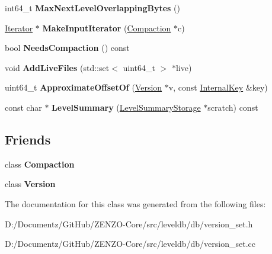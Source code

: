 \begin{DoxyCompactItemize}
\mbox{\label{classleveldb_1_1_version_set_a32dc1a7e1eaeeeac89286be3483ad612}} 
int64\+\_\+t {\bfseries Max\+Next\+Level\+Overlapping\+Bytes} ()
\item 
\mbox{\label{classleveldb_1_1_version_set_a181194e96a88e69a60c1fda9cf3c4651}} 
\mbox{\hyperlink{classleveldb_1_1_iterator}{Iterator}} $\ast$ {\bfseries Make\+Input\+Iterator} (\mbox{\hyperlink{classleveldb_1_1_compaction}{Compaction}} $\ast$c)
\item 
\mbox{\label{classleveldb_1_1_version_set_a5a8a8a80e14a141672c7fdc9c7dd7328}} 
bool {\bfseries Needs\+Compaction} () const
\item 
\mbox{\label{classleveldb_1_1_version_set_a3b3c810f0fea88db81b94e604b3dd78f}} 
void {\bfseries Add\+Live\+Files} (std\+::set$<$ uint64\+\_\+t $>$ $\ast$live)
\item 
\mbox{\label{classleveldb_1_1_version_set_ada7f3ed63b1c48adb6e5b38348b300e1}} 
uint64\+\_\+t {\bfseries Approximate\+Offset\+Of} (\mbox{\hyperlink{classleveldb_1_1_version}{Version}} $\ast$v, const \mbox{\hyperlink{classleveldb_1_1_internal_key}{Internal\+Key}} \&key)
\item 
\mbox{\label{classleveldb_1_1_version_set_a1c49a6a2f6c6346d19d57ade22e04ee2}} 
const char $\ast$ {\bfseries Level\+Summary} (\mbox{\hyperlink{structleveldb_1_1_version_set_1_1_level_summary_storage}{Level\+Summary\+Storage}} $\ast$scratch) const
\end{DoxyCompactItemize}
\subsection*{Friends}
\begin{DoxyCompactItemize}
\item 
\mbox{\label{classleveldb_1_1_version_set_a9372e882b35d27c78356228e4b758917}} 
class {\bfseries Compaction}
\item 
\mbox{\label{classleveldb_1_1_version_set_ace162f32d4abb584945d3a55a389b0a3}} 
class {\bfseries Version}
\end{DoxyCompactItemize}


The documentation for this class was generated from the following files\+:\begin{DoxyCompactItemize}
\item 
D\+:/\+Documentz/\+Git\+Hub/\+Z\+E\+N\+Z\+O-\/\+Core/src/leveldb/db/version\+\_\+set.\+h\item 
D\+:/\+Documentz/\+Git\+Hub/\+Z\+E\+N\+Z\+O-\/\+Core/src/leveldb/db/version\+\_\+set.\+cc\end{DoxyCompactItemize}
